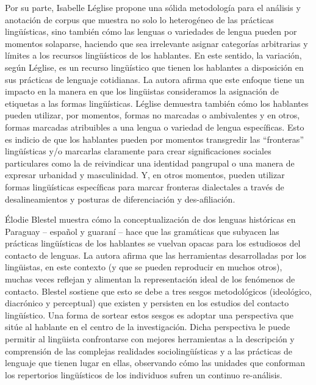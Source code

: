 \documentclass[output=paper]{langscibook}
\begin{document}
Por su parte, Isabelle Léglise propone una sólida metodología para el análisis y anotación de corpus que muestra no solo lo heterogéneo de las prácticas lingüísticas, sino también cómo las lenguas o variedades de lengua pueden por momentos solaparse, haciendo que sea irrelevante asignar categorías arbitrarias y límites a los recursos lingüísticos de los hablantes. En este sentido, la variación, según Léglise, es un recurso lingüístico que tienen los hablantes a disposición en sus prácticas de lenguaje cotidianas. La autora afirma que este enfoque tiene un impacto en la manera en que los lingüistas consideramos la asignación de etiquetas a las formas lingüísticas. Léglise demuestra también cómo los hablantes pueden utilizar, por momentos, formas no marcadas o ambivalentes \citep{Woolard1998} y en otros, formas marcadas atribuibles a una lengua o variedad de lengua específicas. Esto es indicio de que los hablantes pueden por momentos transgredir las “fronteras” lingüísticas y/o marcarlas claramente para crear significaciones sociales particulares como la de reivindicar una identidad pangrupal o una manera de expresar urbanidad y masculinidad. Y, en otros momentos, pueden utilizar formas lingüísticas específicas para marcar fronteras dialectales a través de desalineamientos y posturas de diferenciación y des-afiliación.

Élodie Blestel muestra cómo la conceptualización de dos lenguas históricas en Paraguay -- español y guaraní -- hace que las gramáticas que subyacen las prácticas lingüísticas de los hablantes se vuelvan opacas para los estudiosos del contacto de lenguas. La autora afirma que las herramientas desarrolladas por los lingüistas, en este contexto (y que se pueden reproducir en muchos otros), muchas veces reflejan y alimentan la representación ideal de los fenómenos de contacto. Blestel sostiene que esto se debe a tres sesgos metodológicos (ideológico, diacrónico y perceptual) que existen y persisten en los estudios del contacto lingüístico. Una forma de sortear estos sesgos es adoptar una perspectiva que sitúe al hablante en el centro de la investigación. Dicha perspectiva le puede permitir al lingüista confrontarse con mejores herramientas a la descripción y comprensión de las complejas realidades sociolingüísticas y a las prácticas de lenguaje que tienen lugar en ellas, observando cómo las unidades que conforman los repertorios lingüísticos de los individuos sufren un continuo re-análisis. 
\end{document}
